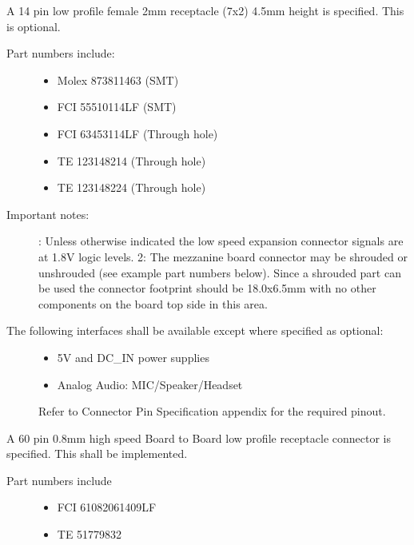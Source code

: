 \documentclass[a4paper,10pt,oneside,english]{sphinxmanual}
\begin{document}
\sphinxAtStartPar
A 14 pin low profile female 2mm receptacle (7x2) 4.5mm height is specified. This is optional.
\begin{description}
\item[{Part numbers include:}] \leavevmode\begin{itemize}
\item {} 
\sphinxAtStartPar
Molex 87381\sphinxhyphen{}1463 (SMT)

\item {} 
\sphinxAtStartPar
FCI 55510\sphinxhyphen{}114LF (SMT)

\item {} 
\sphinxAtStartPar
FCI 63453\sphinxhyphen{}114LF (Through hole)

\item {} 
\sphinxAtStartPar
TE 1\sphinxhyphen{}2314821\sphinxhyphen{}4 (Through hole)

\item {} 
\sphinxAtStartPar
TE 1\sphinxhyphen{}2314822\sphinxhyphen{}4 (Through hole)

\end{itemize}

\item[{Important notes:}] \leavevmode
{}: Unless otherwise indicated the low speed expansion connector signals are at 1.8V logic levels.
2: The mezzanine board connector may be shrouded or unshrouded (see example part numbers below). Since a shrouded part can be used the connector footprint should be 18.0x6.5mm with no other components on the board top side in this area.

\item[{The following  interfaces shall be available except where specified as optional:}] \leavevmode\begin{itemize}
\item {} 
\sphinxAtStartPar
5V and DC\_IN power supplies

\item {} 
\sphinxAtStartPar
Analog Audio: MIC/Speaker/Headset

\end{itemize}

\sphinxAtStartPar
Refer to Connector Pin Specification appendix for the required pinout.

\end{description}

\sphinxAtStartPar
{}

\sphinxAtStartPar
A 60 pin 0.8mm high speed Board to Board low profile receptacle connector is specified. This shall be implemented.
\begin{description}
\item[{Part numbers include}] \leavevmode\begin{itemize}
\item {} 
\sphinxAtStartPar
FCI 61082\sphinxhyphen{}061409LF

\item {} 
\sphinxAtStartPar
TE 5177983\sphinxhyphen{}2

\end{itemize}

\end{description}
\end{document}

